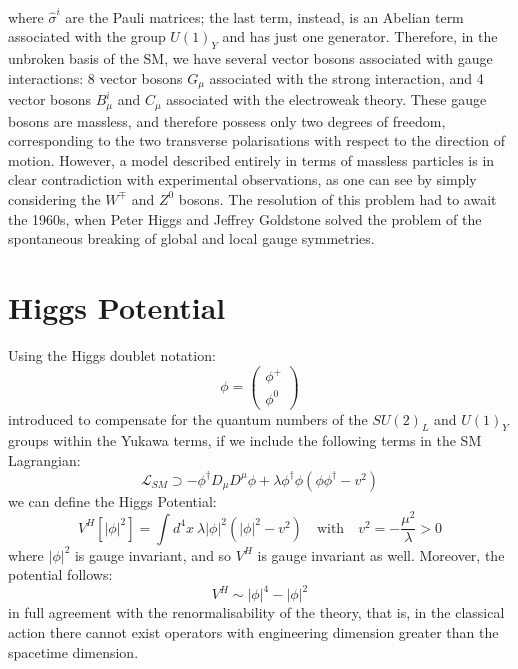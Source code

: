 \documentclass[11pt,a4paper,twoside,openright]{report}
\begin{document}
where \(\hat{\sigma}^i\) are the Pauli matrices; the last term, instead, is an Abelian term associated with the group \(U(1)_Y\) and has just one generator. Therefore, in the unbroken basis of the SM, we have several vector bosons associated with gauge interactions: 8 vector bosons \(G_\mu\) associated with the strong interaction, and 4 vector bosons \(B_\mu^i\) and \(C_\mu\) associated with the electroweak theory. These gauge bosons are massless, and therefore possess only two degrees of freedom, corresponding to the two transverse polarisations with respect to the direction of motion. However, a model described entirely in terms of massless particles is in clear contradiction with experimental observations, as one can see by simply considering the \(W^{\mp}\) and \(Z^0\) bosons. The resolution of this problem had to await the 1960s, when Peter Higgs and Jeffrey Goldstone solved the problem of the spontaneous breaking of global and local gauge symmetries.

\section{Higgs Potential}
Using the Higgs doublet notation:
\begin{equation}
\phi = \begin{pmatrix} \phi^+ \\ \phi^0 \end{pmatrix}
\end{equation}
introduced to compensate for the quantum numbers of the \(SU(2)_L\) and \(U(1)_Y\) groups within the Yukawa terms, if we include the following terms in the SM Lagrangian:
\begin{equation}
\mathcal{L}_{SM} \supset -\phi^\dagger D_\mu D^\mu \phi +\lambda \phi^\dagger \phi(\phi\phi^\dagger-v^2)
\end{equation}
we can define the Higgs Potential:
\begin{equation}
V^H\left[ |\phi|^2\right] = \int d^4x\ \lambda|\phi|^2(|\phi|^2-v^2) \quad \text{with}\quad v^2=-\frac{\mu^2}{\lambda}>0
\end{equation}
where \(|\phi|^2\) is gauge invariant, and so \(V^H\) is gauge invariant as well. Moreover, the potential follows:
\begin{equation}
V^H\sim|\phi|^4-|\phi|^2
\end{equation}
in full agreement with the renormalisability of the theory, that is, in the classical action there cannot exist operators with engineering dimension greater than the spacetime dimension.
\end{document}
